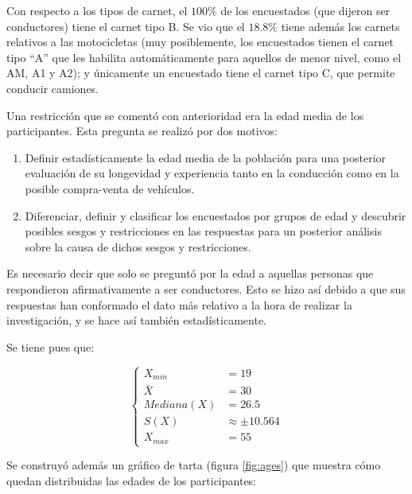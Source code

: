 Con respecto a los tipos de carnet, el $100\%$ de los encuestados (que dijeron ser
conductores) tiene el carnet tipo B. Se vio que el $18.8\%$ tiene además los
carnets relativos a las motocicletas (muy posiblemente, los encuestados tienen el
carnet tipo ``A'' que les habilita automáticamente para aquellos de menor nivel,
como el AM, A1 y A2); y únicamente un encuestado tiene el carnet tipo C, que permite
conducir camiones.

Una restricción que se comentó con anterioridad era la edad media de los participantes.
Esta pregunta se realizó por dos motivos:

\begin{enumerate}
  \item Definir estadísticamente la edad media de la población para una posterior evaluación
        de su longevidad y experiencia tanto en la conducción como en la posible
        compra-venta de vehículos.
  \item Diferenciar, definir y clasificar los encuestados por grupos de edad y descubrir
        posibles sesgos y restricciones en las respuestas para un posterior análisis
        sobre la causa de dichos sesgos y restricciones.
\end{enumerate}

Es necesario decir que solo se preguntó por la edad a aquellas personas que respondieron
afirmativamente a ser conductores. Esto se hizo así debido a que sus respuestas han
conformado el dato más relativo a la hora de realizar la investigación, y se hace así
también estadísticamente.

Se tiene pues que:

\begin{equation}\label{eq:ages}
  \left\{\begin{aligned}
    X_{min}               & = 19               \\
    \bar{X}               & = 30               \\
    Mediana\left(X\right) & = 26.5             \\
    S\left(X\right)       & \approx \pm 10.564 \\
    X_{max}               & = 55
  \end{aligned}\right.
\end{equation}

Se construyó además un gráfico de tarta (figura \ref{fig:ages}) que muestra cómo
quedan distribuidas las edades de los participantes:

